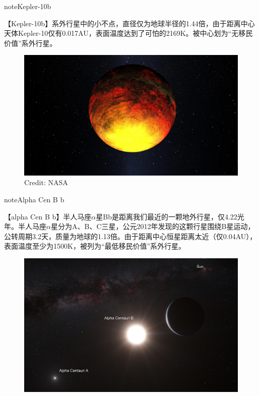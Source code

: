 \documentclass[letterpaper,10pt,english]{sphinxmanual}
\begin{document}
\begin{notice}{note}{Kepler-10b}

【Kepler-10b】系外行星中的小不点，直径仅为地球半径的1.44倍，由于距离中心天体Kepler-10仅有0.017AU，表面温度达到了可怕的2169K。被中心划为“无移民价值”系外行星。
\begin{figure}[htbp]
\centering
\capstart

\includegraphics{kepler-10b.jpg}
\caption{Credit: NASA}\end{figure}
\end{notice}

\begin{notice}{note}{Alpha Cen B b}

【alpha Cen B b】半人马座\(\alpha\)星Bb是距离我们最近的一颗地外行星，仅4.22光年。半人马座\(\alpha\)星分为A、B、C三星，公元2012年发现的这颗行星围绕B星运动，公转周期3.2天，质量为地球的1.13倍。由于距离中心恒星距离太近（仅0.04AU），表面温度至少为1500K，被列为“最低移民价值”系外行星。
\begin{figure}[htbp]
\centering

\includegraphics{alpha-cen-b-b.jpg}
\end{figure}
\end{notice}
\end{document}
